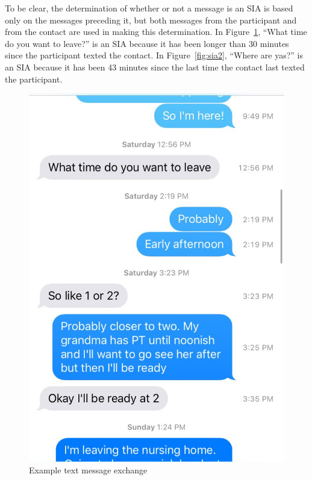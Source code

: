 \documentclass[12pt]{nuthesis}	%
\begin{document}
 To be clear, the determination of whether or not a message is an SIA is based only on the messages preceding it, but both messages from the participant and from the contact are used in making this determination. In Figure~\ref{fig:sia}, ``What time do you want to leave?'' is an SIA because it has been longer than 30 minutes since the participant texted the contact. In Figure~\ref{fig:sia2}, ``Where are yas?'' is an SIA because it has been 43 minutes since the last time the contact last texted the participant.


\begin{figure}[h]
\centering
\includegraphics[width=.7\textwidth]{figures/example_sia}
\caption{Example text message exchange}
\label{fig:sia}
\end{figure}
\end{document}
